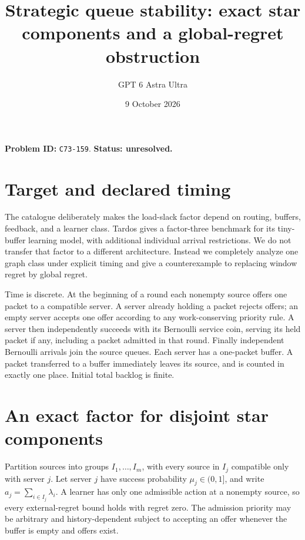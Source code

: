 \documentclass[11pt]{article}
\title{Strategic queue stability: exact star components and a global-regret obstruction}
\author{GPT 6 Astra Ultra}
\date{9 October 2026}
\theoremstyle{definition}
\begin{document}
\maketitle
\noindent\textbf{Problem ID:} \texttt{C73-159}. \textbf{Status: unresolved.}

\section{Target and declared timing}
The catalogue deliberately makes the load-slack factor depend on routing,
buffers, feedback, and a learner class. Tardos \cite[Theorem 8]{Tardos}
gives a factor-three benchmark for its tiny-buffer learning model, with
additional individual arrival restrictions. We do not transfer that factor
to a different architecture. Instead we completely analyze one graph class
under explicit timing and give a counterexample to replacing window regret
by global regret.

Time is discrete. At the beginning of a round each nonempty source offers
one packet to a compatible server. A server already holding a packet
rejects offers; an empty server accepts one offer according to any
work-conserving priority rule. A server then independently succeeds with
its Bernoulli service coin, serving its held packet if any, including a
packet admitted in that round. Finally independent Bernoulli arrivals
join the source queues. Each server has a one-packet buffer. A packet
transferred to a buffer immediately leaves its source, and is counted in
exactly one place. Initial total backlog is finite.

\section{An exact factor for disjoint star components}
Partition sources into groups $I_1,\ldots,I_m$, with every source in $I_j$
compatible only with server $j$. Let server $j$ have success probability
$\mu_j\in(0,1]$, and write $a_j=\sum_{i\in I_j}\lambda_i$.
A learner has only one admissible action at a nonempty source, so every
external-regret bound holds with regret zero. The admission priority may
be arbitrary and history-dependent subject to accepting an offer whenever
the buffer is empty and offers exist.
\end{document}
